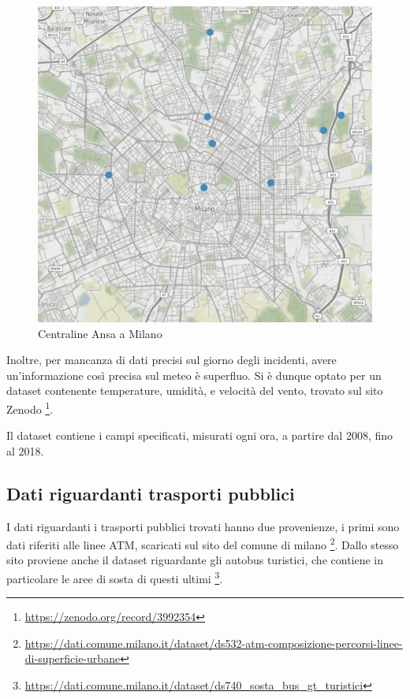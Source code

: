 \documentclass[a4paper]{report}
\begin{document}
\begin{figure}
    \includegraphics[width=\linewidth]{../src/meteo/centraline_ansa.png}
    \caption{Centraline Ansa a Milano}
    \label{fig:centraline-ansa}
\end{figure}


Inoltre, per mancanza di dati precisi sul giorno degli incidenti, avere un'informazione così 
precisa sul meteo è superfluo.
Si è dunque optato per un dataset contenente temperature, umidità, e velocità del vento, 
trovato sul sito Zenodo
\footnote{\url{https://zenodo.org/record/3992354}}.

Il dataset contiene i campi specificati, misurati ogni ora, a partire dal 2008, fino al 2018.

\subsection{Dati riguardanti trasporti pubblici}
I dati riguardanti i trasporti pubblici trovati hanno due provenienze, i primi sono 
dati riferiti alle linee ATM, scaricati sul sito del comune di milano
\footnote{\url{https://dati.comune.milano.it/dataset/ds532-atm-composizione-percorsi-linee-di-superficie-urbane}}.
Dallo stesso sito proviene anche il dataset riguardante gli autobus turistici, che 
contiene in particolare le aree di sosta di questi ultimi
\footnote{\url{https://dati.comune.milano.it/dataset/ds740_sosta_bus_gt_turistici}}.
\end{document}

